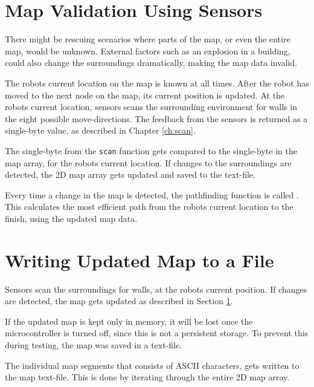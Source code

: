 \section{Map Validation Using Sensors}
\label{sec:map_check} %
There might be rescuing scenarios where parts of the map, or even the entire map, would be unknown.
External factors such as an explosion in a building, could also change the surroundings dramatically, making the map data invalid.
 
The robots current location on the map is known at all times. 
After the robot has moved to the next node on the map, its current position is updated.
At the robots current location, sensors scans the surrounding environment for walls in the eight possible move-directions.
The feedback from the sensors is returned as a single-byte value, as described in Chapter \ref{ch:scan}.

The single-byte from the {\tt scan} function gets compared to the single-byte in the map array, for the robots current location.
If changes to the surroundings are detected, the 2D map array gets updated and saved to the text-file.

Every time a change in the map is detected, the pathfinding function is called
. 
This calculates the most efficient path from the robots current location to the finish, using the updated map data. 

\section{Writing Updated Map to a File}
\label{sec:map_save} %
Sensors scan the surroundings for walls, at the robots current position.
If changes are detected, the map gets updated as described in Section \ref{sec:map_check}.

If the updated map is kept only in memory, it will be lost once the microcontroller is turned off, since this is not a persistent storage. To prevent this during testing, the map was saved in a text-file.

The individual map segments that consists of ASCII characters, gets written to the map text-file.
This is done by iterating through the entire 2D map array.


